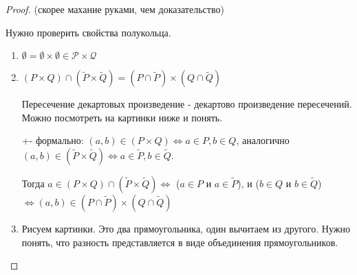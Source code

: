 \begin{proof}\thmslashn
	
	(скорее махание руками, чем доказательство)
	
    Нужно проверить свойства полукольца.

    \begin{enumerate}
        \item 
	$\emptyset = \emptyset \times \emptyset \in \mathcal{P} \times \mathcal{Q}$
	    \item 
	$(P\times Q) \cap (\tilde{P} \times\tilde{Q}) = (P \cap \tilde{P}) \times (Q\cap \tilde{Q})$

    Пересечение декартовых произведение - декартово произведение пересечений. Можно посмотреть на картинки ниже и понять. 

    +- формально: $(a, b) \in (P \times Q) \iff a \in P, b \in Q$, аналогично $(a,b) \in (\tilde{P} \times \tilde{Q}) \iff a \in \tilde{P}, b \in \tilde{Q}$.

    Тогда $a \in (P \times Q) \cap (\tilde{P} \times \tilde{Q}) \iff$ ($a \in P$ и $a \in \tilde{P}$), и ($b \in Q$ и $b \in \tilde{Q}$) $\iff (a, b) \in (P \cap \tilde{P}) \times (Q \cap \tilde{Q})$
	
	    \item
	Рисуем картинки. Это два прямоугольника, один вычитаем из другого. Нужно понять, что разность представляется в виде объединения прямоугольников.
	

\end{enumerate}
\end{proof}
